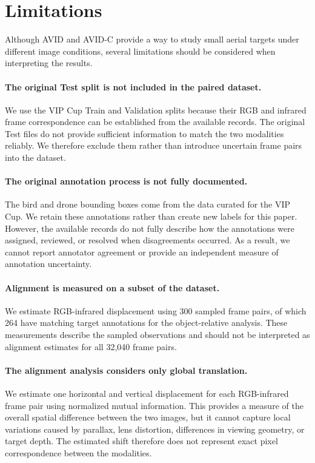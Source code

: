 \documentclass[10pt]{article}
\newcommand{\dataset}{\textsc{AVID}}
\newcommand{\corrupt}{\textsc{AVID-C}}
\begin{document}
\section{Limitations}
\label{sec:limitations}

Although \dataset{} and \corrupt{} provide a way to study small aerial targets under different image conditions, several limitations should be considered when interpreting the results.

\paragraph{The original Test split is not included in the paired dataset.}
We use the VIP Cup Train and Validation splits because their RGB and infrared frame correspondence can be established from the available records. The original Test files do not provide sufficient information to match the two modalities reliably. We therefore exclude them rather than introduce uncertain frame pairs into the dataset.

\paragraph{The original annotation process is not fully documented.}
The bird and drone bounding boxes come from the data curated for the VIP Cup. We retain these annotations rather than create new labels for this paper. However, the available records do not fully describe how the annotations were assigned, reviewed, or resolved when disagreements occurred. As a result, we cannot report annotator agreement or provide an independent measure of annotation uncertainty.

\paragraph{Alignment is measured on a subset of the dataset.}
We estimate RGB-infrared displacement using 300 sampled frame pairs, of which 264 have matching target annotations for the object-relative analysis. These measurements describe the sampled observations and should not be interpreted as alignment estimates for all 32,040 frame pairs.

\paragraph{The alignment analysis considers only global translation.}
We estimate one horizontal and vertical displacement for each RGB-infrared frame pair using normalized mutual information. This provides a measure of the overall spatial difference between the two images, but it cannot capture local variations caused by parallax, lens distortion, differences in viewing geometry, or target depth. The estimated shift therefore does not represent exact pixel correspondence between the modalities.
\end{document}
